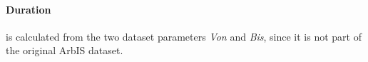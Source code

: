\paragraph{Duration} is calculated from the two dataset parameters \textit{Von} and \textit{Bis}, since it is not part of the original ArbIS dataset.

